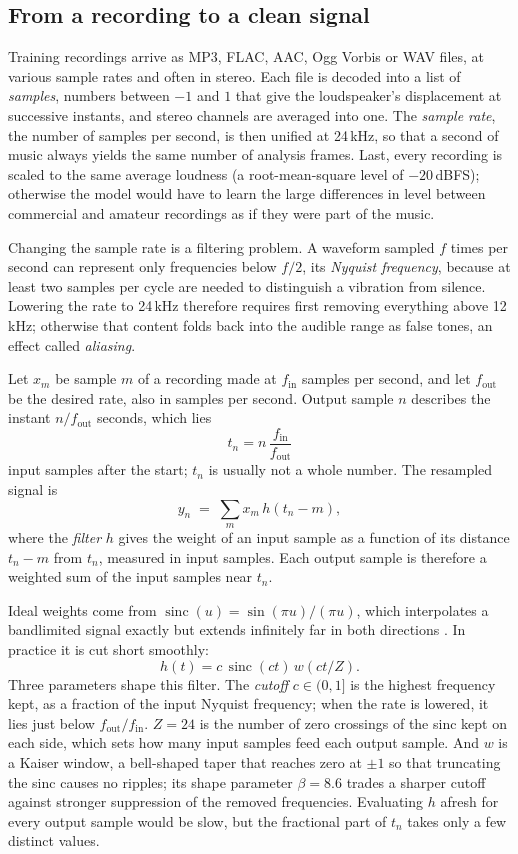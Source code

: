 \subsection{From a recording to a clean signal}

Training recordings arrive as MP3, FLAC, AAC, Ogg Vorbis or WAV files, at
various sample rates and often in stereo. Each file is decoded into a list of
\emph{samples}, numbers between $-1$ and $1$ that give the loudspeaker's
displacement at successive instants, and stereo channels are averaged into one.
The \emph{sample rate}, the number of samples per second, is then unified at
24\,kHz, so that a second of music always yields the same number of analysis
frames. Last, every recording is scaled to the same average loudness (a
root-mean-square level of $-20$\,dBFS); otherwise the model would have to learn
the large differences in level between commercial and amateur recordings as if
they were part of the music.

Changing the sample rate is a filtering problem. A waveform sampled $f$ times
per second can represent only frequencies below $f/2$, its \emph{Nyquist
frequency}, because at least two samples per cycle are needed to distinguish a
vibration from silence. Lowering the rate to 24\,kHz therefore requires first
removing everything above 12\,kHz; otherwise that content folds back into the
audible range as false tones, an effect called \emph{aliasing}.

\begin{definition}
Let $x_m$ be sample $m$ of a recording made at $f_\text{in}$ samples per second,
and let $f_\text{out}$ be the desired rate, also in samples per second. Output
sample $n$ describes the instant $n / f_\text{out}$ seconds, which lies
\[
t_n = n\,\frac{f_\text{in}}{f_\text{out}}
\]
input samples after the start; $t_n$ is usually not a whole number. The
resampled signal is
\[
y_n \;=\; \sum_{m} x_m \, h\!\left(t_n - m\right),
\]
where the \emph{filter} $h$ gives the weight of an input sample as a function of
its distance $t_n - m$ from $t_n$, measured in input samples. Each output sample
is therefore a weighted sum of the input samples near $t_n$.
\end{definition}

Ideal weights come from $\operatorname{sinc}(u) = \sin(\pi u)/(\pi u)$, which
interpolates a bandlimited signal exactly but extends infinitely far in both
directions \cite{smith2002resample}. In practice it is cut short smoothly:
\[
h(t) = c\,\operatorname{sinc}(ct)\,w(ct/Z).
\]
Three parameters shape this filter. The \emph{cutoff} $c \in (0, 1]$ is the
highest frequency kept, as a fraction of the input Nyquist frequency; when the
rate is lowered, it lies just below $f_\text{out}/f_\text{in}$. $Z = 24$ is the
number of zero crossings of the sinc kept on each side, which sets how many
input samples feed each output sample. And $w$ is a Kaiser window, a
bell-shaped taper that reaches zero at $\pm 1$ so that truncating the sinc
causes no ripples; its shape parameter $\beta = 8.6$ trades a sharper cutoff
against stronger suppression of the removed frequencies. Evaluating $h$ afresh
for every output sample would be slow, but the fractional part of $t_n$ takes
only a few distinct values.


